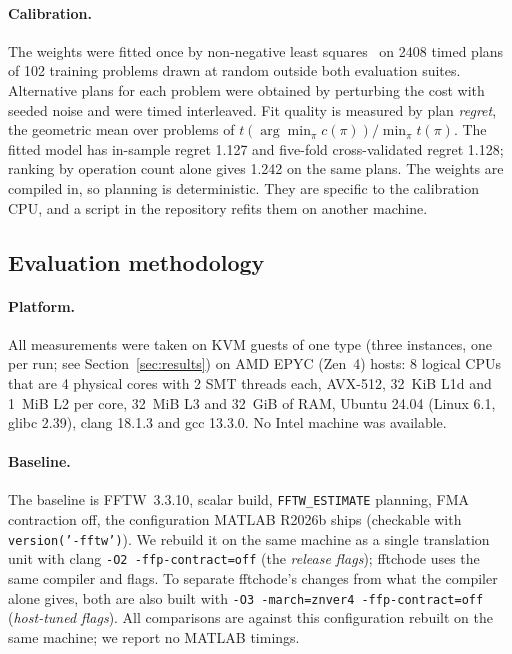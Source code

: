 \documentclass[10pt]{article}
\theoremstyle{definition}
\begin{document}
\paragraph{Calibration.} The weights were fitted once by non-negative least squares~\cite{lawson1974nnls} on 2408 timed plans of 102 training problems drawn at random outside both evaluation suites. Alternative plans for each problem were obtained by perturbing the cost with seeded noise and were timed interleaved. Fit quality is measured by plan \emph{regret}, the geometric mean over problems of $t(\arg\min_\pi c(\pi))/\min_\pi t(\pi)$. The fitted model has in-sample regret 1.127 and five-fold cross-validated regret 1.128; ranking by operation count alone gives 1.242 on the same plans. The weights are compiled in, so planning is deterministic. They are specific to the calibration CPU, and a script in the repository refits them on another machine.

\subsection{Evaluation methodology}\label{sec:evalmethod}

\paragraph{Platform.} All measurements were taken on KVM guests of one type (three instances, one per run; see Section~\ref{sec:results}) on AMD EPYC (Zen~4) hosts: 8 logical CPUs that are 4 physical cores with 2 SMT threads each, AVX-512, 32~KiB L1d and 1~MiB L2 per core, 32~MiB L3 and 32~GiB of RAM, Ubuntu 24.04 (Linux 6.1, glibc 2.39), clang 18.1.3 and gcc 13.3.0. No Intel machine was available.

\paragraph{Baseline.} The baseline is FFTW~3.3.10, scalar build, \texttt{FFTW\_ESTIMATE} planning, FMA contraction off, the configuration MATLAB R2026b ships (checkable with \texttt{version('-fftw')}). We rebuild it on the same machine as a single translation unit with clang \texttt{-O2 -ffp-contract=off} (the \emph{release flags}); fftchode uses the same compiler and flags. To separate fftchode's changes from what the compiler alone gives, both are also built with \texttt{-O3 -march=znver4 -ffp-contract=off} (\emph{host-tuned flags}). All comparisons are against this configuration rebuilt on the same machine; we report no MATLAB timings.
\end{document}
